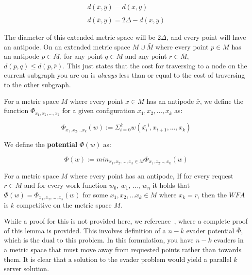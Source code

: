 \begin{equation*}
    \begin{gathered}
        d(\bar{x}, \bar{y}) = d(x,y)\\ \\
        d(\bar{x}, y) = 2\Delta - d(x,y)
    \end{gathered}
\end{equation*}

The diameter of this extended metric space will be $2\Delta$, and every point will have an antipode. On an extended metric space $M \cup \bar{M}$ where every point $p \in M$ has an antipode $\bar{p} \in \bar{M}$, for any point $q \in M$ and any point $\bar{r} \in \bar{M}$, $d(p,q) \leq d(p,\bar{r})$. This just states that the cost for traversing to a node on the current subgraph you are on is \textit{always} less than or equal to the cost of traversing to the other subgraph.

\begin{definition}
    For a metric space $M$ where every point $x \in M$ has an antipode $\bar{x}$, we define the function \textbf{$\Phi_{x_1, x_2, ..., x_k}$} for a given configuration $x_1, x_2, ..., x_k$ as:

    \begin{equation*}
        \Phi_{x_1, x_2, ..x_k}(w) := \Sigma_{i=0}^k w(\bar{x_i}^i, x_{i+1}, ..., x_k)
    \end{equation*}
\end{definition}

\begin{definition}
    We define the \textbf{potential} $\Phi (w)$ as:

    \begin{equation*}
        \Phi(w) := min_{x_1, x_2, ..., x_k \in M} \Phi_{x_1, x_2..., x_k} (w)
    \end{equation*}
\end{definition}

\begin{lemma}
    For a metric space $M$ where every point has an antipode, If for every request $r \in M$ and for every work function $w_0$, $w_1$, ..., $w_n$ it holds that $\Phi(w) = \Phi_{x_1, x_2, ..., x_k}(w)$ for some $x_1, x_2, ...x_k \in M$ where $x_k = r$, then the $WFA$ is $k$ competitive on the metric space $M$.
\end{lemma}

While a proof for this is not provided here, we reference~\cite{unifyingPotential2021}, where a complete proof of this lemma is provided. This involves definition of a $n-k$ evader potential $\bar{\Phi}$, which is the dual to this problem. In this formulation, you have $n-k$ evaders in a metric space that must move away from requested points rather than towards them. It is clear that a solution to the evader problem would yield a parallel $k$ server solution.